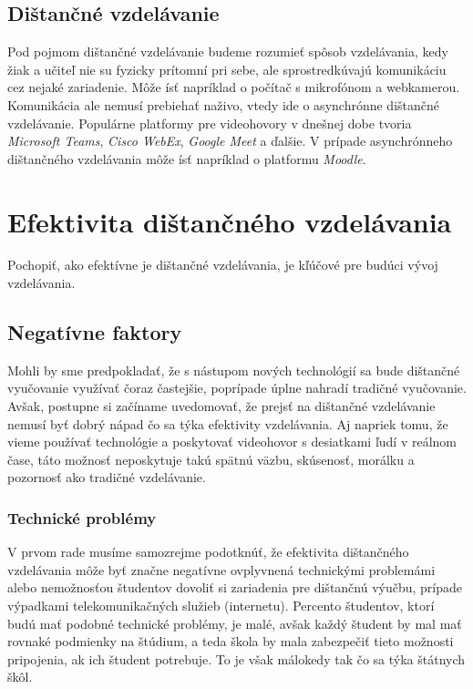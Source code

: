 \documentclass[10pt,twoside,slovak,a4paper]{article}
\begin{document}
\subsection{Dištančné vzdelávanie}
Pod pojmom dištančné vzdelávanie budeme rozumieť spôsob vzdelávania, kedy žiak a učiteľ nie su fyzicky prítomní pri sebe, ale sprostredkúvajú komunikáciu cez nejaké zariadenie. Môže ísť napríklad o počítač s mikrofónom a webkamerou. Komunikácia ale nemusí prebiehať naživo, vtedy ide o asynchrónne dištančné vzdelávanie. Populárne platformy pre videohovory v dnešnej dobe tvoria \textit{Microsoft Teams}, \textit{Cisco WebEx}, \textit{Google Meet} a ďalšie. V prípade asynchrónneho dištančného vzdelávania môže ísť napríklad o platformu \textit{Moodle}.

\section{Efektivita dištančného vzdelávania} \label{efektivita}
Pochopiť, ako efektívne je dištančné vzdelávania, je kľúčové pre budúci vývoj vzdelávania.

\subsection{Negatívne faktory}
Mohli by sme predpokladať, že s nástupom nových technológií sa bude dištančné vyučovanie využívať čoraz častejšie, poprípade úplne nahradí tradičné vyučovanie. Avšak, postupne si začíname uvedomovať, že prejsť na dištančné vzdelávanie nemusí byť dobrý nápad čo sa týka efektivity vzdelávania. Aj napriek tomu, že vieme používať technológie a poskytovať videohovor s desiatkami ľudí v reálnom čase, táto možnosť neposkytuje takú spätnú väzbu, skúsenosť, morálku a pozornosť ako tradičné vzdelávanie\cite{Wang:Investigation}\cite{Weidlich:Impact}.

\subsubsection{Technické problémy}
V prvom rade musíme samozrejme podotknúť, že efektivita dištančného vzdelávania môže byť značne negatívne ovplyvnená technickými problemámi alebo nemožnosťou študentov dovoliť si zariadenia pre dištančnú výučbu, prípade výpadkami telekomunikačných služieb (internetu). Percento študentov, ktorí budú mať podobné technické problémy, je malé, avšak každý študent by mal mať rovnaké podmienky na štúdium, a teda škola by mala zabezpečiť tieto možnosti pripojenia, ak ich študent potrebuje. To je však málokedy tak čo sa týka štátnych škôl.
\end{document}
